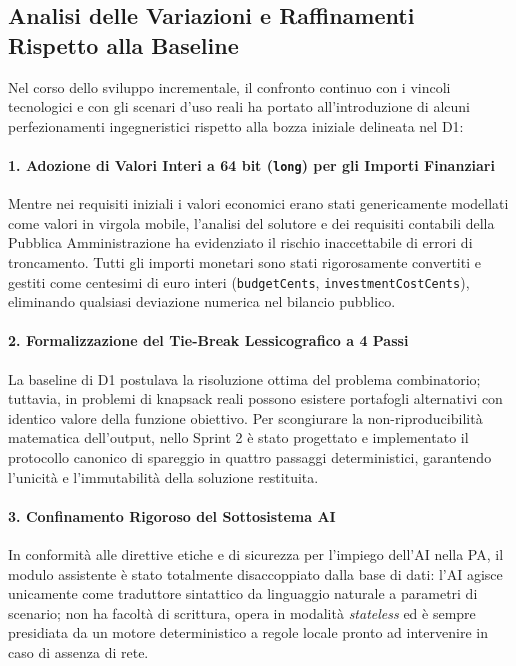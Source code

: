 \subsection{Analisi delle Variazioni e Raffinamenti Rispetto alla Baseline}
Nel corso dello sviluppo incrementale, il confronto continuo con i vincoli tecnologici e con gli scenari d'uso reali ha portato all'introduzione di alcuni perfezionamenti ingegneristici rispetto alla bozza iniziale delineata nel D1:

\paragraph{1. Adozione di Valori Interi a 64 bit (\texttt{long}) per gli Importi Finanziari}
Mentre nei requisiti iniziali i valori economici erano stati genericamente modellati come valori in virgola mobile, l'analisi del solutore e dei requisiti contabili della Pubblica Amministrazione ha evidenziato il rischio inaccettabile di errori di troncamento. Tutti gli importi monetari sono stati rigorosamente convertiti e gestiti come centesimi di euro interi (\texttt{budgetCents}, \texttt{investmentCostCents}), eliminando qualsiasi deviazione numerica nel bilancio pubblico.

\paragraph{2. Formalizzazione del Tie-Break Lessicografico a 4 Passi}
La baseline di D1 postulava la risoluzione ottima del problema combinatorio; tuttavia, in problemi di knapsack reali possono esistere portafogli alternativi con identico valore della funzione obiettivo. Per scongiurare la non-riproducibilità matematica dell'output, nello Sprint 2 è stato progettato e implementato il protocollo canonico di spareggio in quattro passaggi deterministici, garantendo l'unicità e l'immutabilità della soluzione restituita.

\paragraph{3. Confinamento Rigoroso del Sottosistema AI}
In conformità alle direttive etiche e di sicurezza per l'impiego dell'AI nella PA, il modulo assistente è stato totalmente disaccoppiato dalla base di dati: l'AI agisce unicamente come traduttore sintattico da linguaggio naturale a parametri di scenario; non ha facoltà di scrittura, opera in modalità \emph{stateless} ed è sempre presidiata da un motore deterministico a regole locale pronto ad intervenire in caso di assenza di rete.

